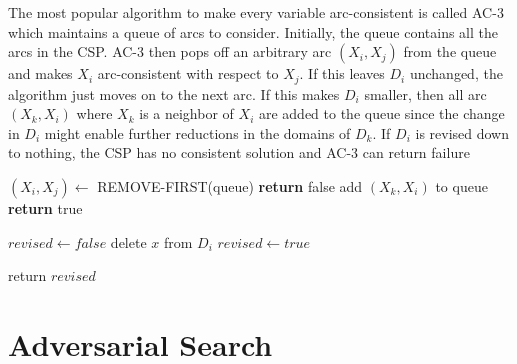 \documentclass{article}
\begin{document}
The most popular algorithm to make every variable arc-consistent is called AC-3 which maintains a queue of arcs to consider. Initially, the queue contains all the arcs in the CSP. AC-3 then pops off an arbitrary arc $(X_i,X_j)$ from the queue and makes $X_i$ arc-consistent with respect to $X_j$. If this leaves $D_i$ unchanged, the algorithm just moves on to the next arc. If this makes $D_i$ smaller, then all arc $(X_k,X_i)$ where $X_k$ is a neighbor of $X_i$ are added to the queue since the change in $D_i$ might enable further reductions in the domains of $D_k$. If $D_i$ is revised down to nothing, the CSP has no consistent solution and AC-3 can return failure


\begin{algorithm}
\begin{algorithmic}

        \State $(X_i,X_j) \leftarrow$ REMOVE-FIRST(queue)
                \State \textbf{return} false
                    \State add $(X_k,X_i)$ to queue
                \EndFor
            \EndIf
        \EndIf
    \EndWhile 
    \State \textbf{return} true 
\EndProcedure


    \State $revised \leftarrow false$
            \State delete $x$ from $D_i$
            \State $revised \leftarrow true$
        \EndIf
        
    \EndFor

    \State return $revised$

\EndProcedure

\end{algorithmic}
\end{algorithm}


\section{Adversarial Search}
\end{document}
